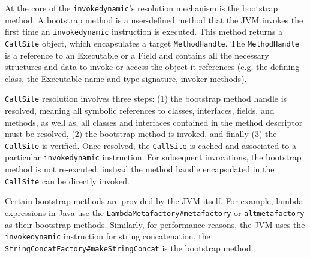 At the core of the \verb|invokedynamic|'s resolution mechanism is the bootstrap method. A bootstrap method is a user-defined method that the JVM invokes the first time an \verb|invokedynamic| instruction is executed. 
This method returns a \verb|CallSite| object, which encapsulates a target \verb|MethodHandle|. The \verb|MethodHandle| is a reference to an Executable or a Field and contains all the necessary structures and data to invoke or access the object it references (e.g. the defining class, the Executable name and type signature, invoker methods). 

\verb|CallSite| resolution involves three steps: (1) the bootstrap method handle is resolved, meaning all symbolic references to classes, interfaces, fields, and methods, as well as, all classes and interfaces contained in the method descriptor must be resolved, (2) the bootstrap method is invoked, and finally (3) the \verb|CallSite| is verified.
Once resolved, the \verb|CallSite| is cached and associated to a particular \verb|invokedynamic| instruction.
For subsequent invocations, the bootstrap method is not re-excuted, instead the method handle encapsulated in the \verb|CallSite| can be directly invoked.

Certain bootstrap methods are provided by the JVM itself. For example, lambda expressions in Java use the \verb|LambdaMetafactory#metafactory| or \verb|altmetafactory| as their bootstrap methods. Similarly, for performance reasons, the JVM uses the \verb|invokedynamic| instruction for string concatenation, the \verb|StringConcatFactory#makeStringConcat| is the bootstrap method.



